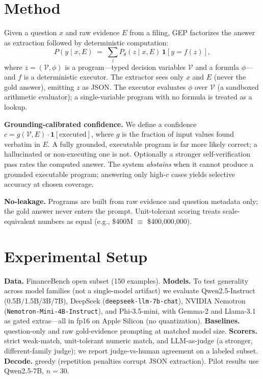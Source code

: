 \documentclass[sigconf,nonacm]{acmart}
\begin{document}
\section{Method}\label{sec:method}
Given a question $x$ and raw evidence $E$ from a filing, \textsc{GEP} factorizes the answer
as extraction followed by deterministic computation:
\[
P(y \mid x, E) \;=\; \sum_{z} P_\theta(z \mid x, E)\, \mathbf{1}[y = f(z)],
\]
where $z=(\mathcal{V},\phi)$ is a program---typed decision variables $\mathcal{V}$ and a formula
$\phi$---and $f$ is a deterministic executor. The extractor sees only $x$ and $E$ (never the gold
answer), emitting $z$ as JSON. The executor evaluates $\phi$ over $\mathcal{V}$ (a sandboxed
arithmetic evaluator); a single-variable program with no formula is treated as a lookup.

\textbf{Grounding-calibrated confidence.} We define a confidence
$c = g(\mathcal{V},E)\cdot\mathbf{1}[\text{executed}]$, where $g$ is the fraction of input values
found verbatim in $E$. A fully grounded, executable program is far more likely correct; a
hallucinated or non-executing one is not. Optionally a stronger self-verification pass rates the
computed answer. The system \emph{abstains} when it cannot produce a grounded executable program;
answering only high-$c$ cases yields selective accuracy at chosen coverage.

\textbf{No-leakage.} Programs are built from raw evidence and question metadata only; the gold
answer never enters the prompt. Unit-tolerant scoring treats scale-equivalent numbers as equal
(e.g., \$400M $\equiv$ \$400{,}000{,}000).

\section{Experimental Setup}\label{sec:setup}
\textbf{Data.} FinanceBench open subset (150 examples). \textbf{Models.} To test generality
across model families (not a single-model artifact) we evaluate Qwen2.5-Instruct
(0.5B/1.5B/3B/7B), DeepSeek (\texttt{deepseek-llm-7b-chat}), NVIDIA Nemotron
(\texttt{Nemotron-Mini-4B-Instruct}), and Phi-3.5-mini, with Gemma-2 and Llama-3.1 as gated
extras---all in fp16 on Apple Silicon (no quantization).
\textbf{Baselines.} question-only and raw gold-evidence prompting at matched model size.
\textbf{Scorers.} strict weak-match, unit-tolerant numeric match, and LLM-as-judge (a stronger,
different-family judge); we report judge-vs-human agreement on a labeled subset. \textbf{Decode.}
greedy (repetition penalties corrupt JSON extraction). Pilot results use Qwen2.5-7B, $n{=}30$.
\end{document}
